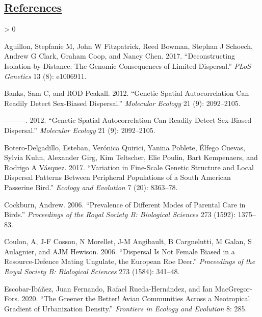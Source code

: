 \documentclass[
]{article}
\newlength{\cslhangindent}
\newenvironment{CSLReferences}[2] %
 {%
  \setlength{\parindent}{0pt}
  \ifodd #1 \everypar{\setlength{\hangindent}{\cslhangindent}}\ignorespaces\fi
  \ifnum #2 > 0
  \setlength{\parskip}{#2\baselineskip}
  \fi
 }%
 {}
\begin{document}
\newpage

\hypertarget{references}{%
\subsection*{\texorpdfstring{\href{MyLibrary.bib}{References}}{References}}\label{references}}

\hypertarget{refs}{}
\begin{CSLReferences}{1}{0}
\leavevmode\hypertarget{ref-aguillon2017deconstructing}{}%
Aguillon, Stepfanie M, John W Fitzpatrick, Reed Bowman, Stephan J
Schoech, Andrew G Clark, Graham Coop, and Nancy Chen. 2017.
{``Deconstructing Isolation-by-Distance: The Genomic Consequences of
Limited Dispersal.''} \emph{PLoS Genetics} 13 (8): e1006911.

\leavevmode\hypertarget{ref-banks2012genetic}{}%
Banks, Sam C, and ROD Peakall. 2012. {``Genetic Spatial Autocorrelation
Can Readily Detect Sex-Biased Dispersal.''} \emph{Molecular Ecology} 21
(9): 2092--2105.

\leavevmode\hypertarget{ref-banks2012genetic}{}%
---------. 2012. {``Genetic Spatial Autocorrelation Can Readily Detect
Sex-Biased Dispersal.''} \emph{Molecular Ecology} 21 (9): 2092--2105.

\leavevmode\hypertarget{ref-botero2017variation}{}%
Botero-Delgadillo, Esteban, Verónica Quirici, Yanina Poblete, Élfego
Cuevas, Sylvia Kuhn, Alexander Girg, Kim Teltscher, Elie Poulin, Bart
Kempenaers, and Rodrigo A Vásquez. 2017. {``Variation in Fine-Scale
Genetic Structure and Local Dispersal Patterns Between Peripheral
Populations of a South American Passerine Bird.''} \emph{Ecology and
Evolution} 7 (20): 8363--78.

\leavevmode\hypertarget{ref-cockburn2006prevalence}{}%
Cockburn, Andrew. 2006. {``Prevalence of Different Modes of Parental
Care in Birds.''} \emph{Proceedings of the Royal Society B: Biological
Sciences} 273 (1592): 1375--83.

\leavevmode\hypertarget{ref-coulon2006dispersal}{}%
Coulon, A, J-F Cosson, N Morellet, J-M Angibault, B Cargnelutti, M
Galan, S Aulagnier, and AJM Hewison. 2006. {``Dispersal Is Not Female
Biased in a Resource-Defence Mating Ungulate, the European Roe Deer.''}
\emph{Proceedings of the Royal Society B: Biological Sciences} 273
(1584): 341--48.

\leavevmode\hypertarget{ref-escobar2020greener}{}%
Escobar-Ibáñez, Juan Fernando, Rafael Rueda-Hernández, and Ian
MacGregor-Fors. 2020. {``The Greener the Better! Avian Communities
Across a Neotropical Gradient of Urbanization Density.''}
\emph{Frontiers in Ecology and Evolution} 8: 285.


\end{CSLReferences}
\end{document}
